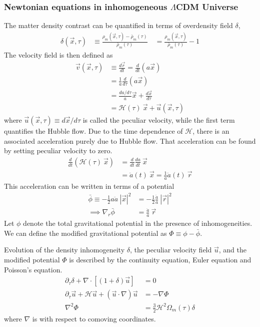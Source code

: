 \documentclass[12pt]{article}
\begin{document}
\subsubsection{Newtonian equations in inhomogeneous $\Lambda$CDM Universe}
\label{sec:newtonian-equations}
The matter density contrast can be quantified in terms of overdensity field $\delta$,
\begin{align}
\delta (\vec{x}, \tau) &\equiv \frac{{\rho}_{m} (\vec{x}, \tau) -\bar{\rho}_{m} (\tau) }{\bar{\rho}_{m} (\tau)} \quad
= \frac{{\rho}_{m} (\vec{x}, \tau) }{\bar{\rho}_{m} (\tau)} - 1
\end{align}
The velocity field is then defined as
\begin{align}
\vec{v} (\vec{x}, \tau) &\equiv \frac{d \vec{r}}{dt} = \frac{d }{dt} (a \vec{x})\\
&= \frac{1}{a} \frac{d }{d \tau} (a \vec{x})\\
&= \frac{da/d \tau}{a} \vec{x} + \frac{d \vec{x}}{d \tau}\\
&= \mathcal{H} (\tau) ~\vec{x} + \vec{u} (\vec{x}, \tau)
\end{align}
where $\vec{u} (\vec{x}, \tau) \equiv d \vec{x} / d\tau$ is called the peculiar velocity, while the first term quantifies the Hubble flow. Due to the time dependence of $\mathcal{H}$, there is an associated acceleration purely due to Hubble flow. That acceleration can be found by setting peculiar velocity to zero. 
\begin{align}
\frac{d}{dt} \left( \mathcal{H} (\tau) ~\vec{x} \right) &= \frac{d}{dt} \frac{da}{dt}  ~\vec{x}\\
&= \ddot{a}(t) ~\vec{x} = \frac{1}{a} \ddot{a}(t) ~\vec{r}
\end{align}
This acceleration can be written in terms of a potential
\begin{align}
\bar{\phi} \equiv - \frac{1}{2} a \ddot{a} ~\left| \vec{x}\right| ^2 &= - \frac{1}{2} \frac{\ddot{a}}{a} ~\left| \vec{r}\right| ^2\\
\implies \nabla_{r} \bar{\phi} &= \frac{\ddot{a}}{a} ~\vec{r}
\end{align}
Let $\phi$ denote the total gravitational potential in the presence of inhomogeneities. We can define the modified gravitational potential as $\Phi \equiv \phi - \bar{\phi}$.

Evolution of the density inhomogeneity $\delta$, the peculiar velocity field  $\vec{u}$, and the modified potential $\Phi$ is described by the continuity equation, Euler equation and Poisson's equation.
\begin{align}
\partial_{\tau} \delta + \nabla \cdot \left[ (1+ \delta) \vec{u} \right] &= 0\\
\partial_{\tau} \vec{u} + \mathcal{H} \vec{u} + \left( \vec{u} \cdot \nabla \right)  \vec{u} &= - \nabla \Phi\\
\nabla^2 \Phi &= \frac{3}{2} \mathcal{H}^2 \Omega_{m}(\tau) \delta
\end{align}
where $\nabla$ is with respect to comoving coordinates.
\end{document}
